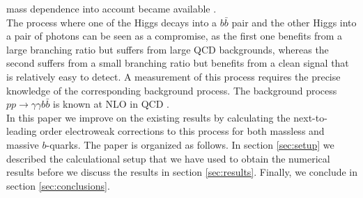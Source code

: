 mass dependence into account became available \cite{Borowka:2016ehy,Borowka:2016ypz}.\\
The process where one of the Higgs decays into a $b\bar{b}$ pair and the other Higgs into a pair of photons can be seen 
as a compromise, as the first one benefits from a large branching ratio but suffers from large QCD backgrounds, whereas the 
second suffers from a small branching ratio but benefits from a clean signal that is relatively easy to detect. A measurement
of this process requires the precise knowledge of the corresponding background process. The background process 
$pp\to \gamma \gamma b \bar{b}$ is known at NLO in QCD \cite{Faeh:2017fpp}.\\ In this paper we improve on the existing 
results by calculating the next-to-leading
order electroweak corrections to this process for both massless and massive $b$-quarks. The paper is organized as follows.
In section \ref{sec:setup} we described the calculational setup that we have used to obtain the numerical results before we
discuss the results in section \ref{sec:results}. Finally, we conclude in section \ref{sec:conclusions}.